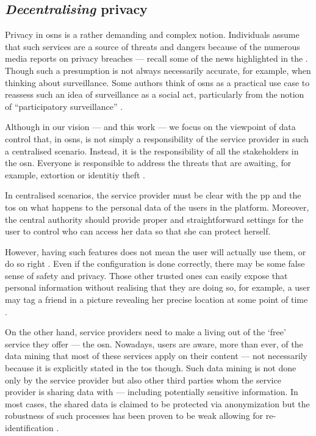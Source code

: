 \subsection{\emph{Decentralising} privacy}
    \label{subsection:thesis:decentralising-privacy}
Privacy in \acp{osn} is a rather demanding and complex notion. Individuals assume 
that such services are a source of threats and dangers because of the numerous media 
reports on privacy breaches --- recall some of the news highlighted in the  
. Though such a presumption is not always necessarily 
accurate, for example, when thinking about surveillance. Some authors think of \acp{osn} 
as a practical use case to reassess such an idea of surveillance as a social act, 
particularly from the notion of ``participatory surveillance'' \cite{Albrechtslund08}.

Although in our vision --- and this work --- we focus on the viewpoint of data control 
that, in \acp{osn}, is not simply a responsibility of the service provider in such 
a centralised scenario. Instead, it is the responsibility of all the stakeholders 
in the \ac{osn}. Everyone is responsible to address the threats that are awaiting, 
for example, extortion or identitiy theft \cite{GrossAH05}. 

In centralised scenarios, the service provider must be clear with the \ac{pp} and 
the \ac{tos} on what happens to the personal data of the users in the platform. 
Moreover, the central authority should provide proper and straightforward settings 
for the user to control who can access her data so that she can protect herself. 

However, having such features does not mean the user will actually use them, or   
do so right \cite{KrishnamurthyW08, BrandtzaegLS10}. Even if the configuration is 
done correctly, there may be some false sense of safety and privacy. Those other 
trusted ones can easily expose that personal information without realising that 
they are doing so, for example, a user may tag a friend in a picture revealing her 
precise location at some point of time \cite{ZhelevaG09, SmithSHV12}. 

On the other hand, service providers need to make a living out of the `free' service
they offer --- the \ac{osn}. Nowadays, users are aware, more than ever, of the data 
mining that most of these services apply on their content --- not necessarily because 
it is explicitly stated in the \ac{tos} though. Such data mining is not done only 
by the service provider but also other third parties whom the service provider is 
sharing data with --- including potentially sensitive information. In most cases, 
the shared data is claimed to be protected via anonymization but the robustness 
of such processes has been proven to be weak allowing for re-identification \cite{NarayananS09}.

